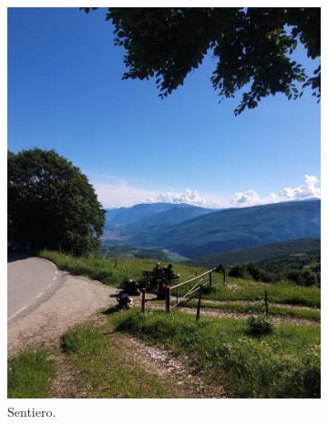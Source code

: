 \documentclass{article}
\begin{document}
\begin{figure}[htbp!]
    \centering
    \begin{subfigure}{0.45\textwidth}
        \centering
        \includegraphics[width=\linewidth]{images/foto_panchina.jpg}
        \caption{Sentiero.}
        \label{fig:foto1}
    \end{subfigure}
    \hfill 
    \begin{subfigure}{0.45\textwidth}
        \centering

\end{subfigure}
\end{figure}
\end{document}
